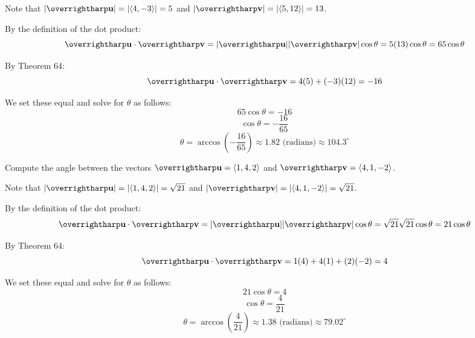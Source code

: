 \documentclass[letterpaper, twoside, 12pt]{book}
\begin{document}
          \begin{solution}
            Note that $|\vect{u}|=|\<4,-3\>|=5$ and
            $|\vect{v}|=|\<5,12\>|=13$.

            By the definition of the dot product:
            \[
              \vect{u}\cdot\vect{v}
                =
              |\vect u||\vect v|\cos\theta
                =
              5(13)\cos\theta
                =
              65\cos\theta
            \]

            By Theorem 64:
            \[
              \vect{u}\cdot\vect{v}
                =
              4(5)+(-3)(12)
                =
              -16
            \]

            We set these equal and solve for $\theta$ as follows:
            \[
              65\cos\theta = -16
            \]
            \[
              \cos\theta = -\frac{16}{65}
            \]
            \[
              \theta = \arccos\left(-\frac{16}{65}\right)
              \approx 1.82 \text{ (radians)}
              \approx 104.3^\circ
            \]
          \end{solution}

          \begin{problem}
            Compute the angle between the vectors
            $\harpvec{u}=\<1,4,2\>$ and $\harpvec{v}=\<4,1,-2\>$.
          \end{problem}

          \begin{solution}
            Note that $|\vect{u}|=|\<1,4,2\>|=\sqrt{21}$ and
            $|\vect{v}|=|\<4,1,-2\>|=\sqrt{21}$.

            By the definition of the dot product:
            \[
              \vect{u}\cdot\vect{v}
                =
              |\vect u||\vect v|\cos\theta
                =
              \sqrt{21}\sqrt{21}\cos\theta
                =
              21\cos\theta
            \]

            By Theorem 64:
            \[
              \vect{u}\cdot\vect{v}
                =
              1(4)+4(1)+(2)(-2)
                =
              4
            \]

            We set these equal and solve for $\theta$ as follows:
            \[
              21\cos\theta = 4
            \]
            \[
              \cos\theta = \frac{4}{21}
            \]
            \[
              \theta = \arccos\left(\frac{4}{21}\right)
              \approx 1.38 \text{ (radians)}
              \approx 79.02^\circ
            \]
          \end{solution}
\end{document}
